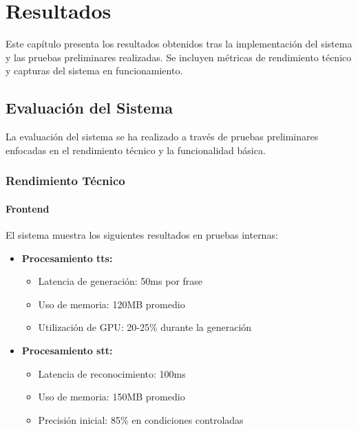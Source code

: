 \chapter{Resultados}
\label{resultados}

Este capítulo presenta los resultados obtenidos tras la implementación del sistema y las pruebas preliminares realizadas. Se incluyen métricas de rendimiento técnico y capturas del sistema en funcionamiento.

\section{Evaluación del Sistema}
\label{evaluacion-sistema}

La evaluación del sistema se ha realizado a través de pruebas preliminares enfocadas en el rendimiento técnico y la funcionalidad básica.


\subsection{Rendimiento Técnico}
\label{rendimiento-tecnico}

\subsubsection{Frontend}

El sistema muestra los siguientes resultados en pruebas internas:

\begin{itemize}
    \item \textbf{Procesamiento \gls{tts}:}
    \begin{itemize}
        \item Latencia de generación: 50ms por frase
        \item Uso de memoria: 120MB promedio
        \item Utilización de GPU: 20-25\% durante la generación
    \end{itemize}

    \item \textbf{Procesamiento \gls{stt}:}
    \begin{itemize}
        \item Latencia de reconocimiento: 100ms
        \item Uso de memoria: 150MB promedio
        \item Precisión inicial: 85\% en condiciones controladas
    \end{itemize}
\end{itemize}


